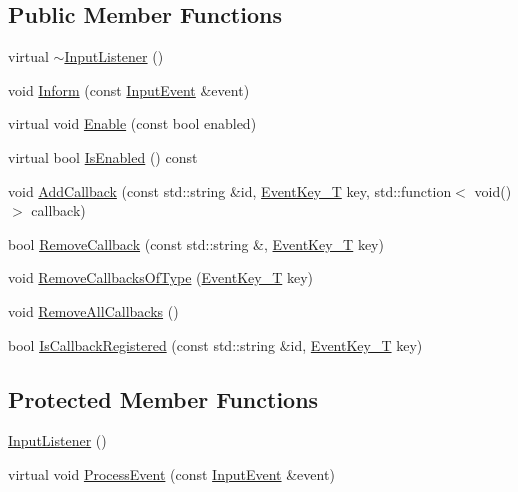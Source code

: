 \subsection*{Public Member Functions}
\begin{DoxyCompactItemize}
\item 
virtual \mbox{\hyperlink{classec_1_1_input_listener_afd65ca201e735f5758646d6653f42804}{$\sim$\+Input\+Listener}} ()
\item 
void \mbox{\hyperlink{classec_1_1_input_listener_afa340cac5b314410b157c1a63df32540}{Inform}} (const \mbox{\hyperlink{structec_1_1_input_event}{Input\+Event}} \&event)
\item 
virtual void \mbox{\hyperlink{classec_1_1_input_listener_abc475ae19a77d3b2f3cf622a23aad123}{Enable}} (const bool enabled)
\item 
virtual bool \mbox{\hyperlink{classec_1_1_input_listener_aab0a7d62f153cf1e10dfbfb58517e063}{Is\+Enabled}} () const
\item 
void \mbox{\hyperlink{classec_1_1_input_listener_abd10663298114e8790d695feab96b188}{Add\+Callback}} (const std\+::string \&id, \mbox{\hyperlink{namespaceec_a5de6bdb8c4b2ed6e590e721ec998f964}{Event\+Key\+\_\+T}} key, std\+::function$<$ void()$>$ callback)
\item 
bool \mbox{\hyperlink{classec_1_1_input_listener_a8903c97def61ce6b9b15f36b26998883}{Remove\+Callback}} (const std\+::string \&, \mbox{\hyperlink{namespaceec_a5de6bdb8c4b2ed6e590e721ec998f964}{Event\+Key\+\_\+T}} key)
\item 
void \mbox{\hyperlink{classec_1_1_input_listener_ae5cf00215ffda9b797e7d6954da2acef}{Remove\+Callbacks\+Of\+Type}} (\mbox{\hyperlink{namespaceec_a5de6bdb8c4b2ed6e590e721ec998f964}{Event\+Key\+\_\+T}} key)
\item 
void \mbox{\hyperlink{classec_1_1_input_listener_af7dd3e51508a10667973c36ef7ef48a8}{Remove\+All\+Callbacks}} ()
\item 
bool \mbox{\hyperlink{classec_1_1_input_listener_a82c8ee6b16d7b3a05d55aded95bcb658}{Is\+Callback\+Registered}} (const std\+::string \&id, \mbox{\hyperlink{namespaceec_a5de6bdb8c4b2ed6e590e721ec998f964}{Event\+Key\+\_\+T}} key)
\end{DoxyCompactItemize}
\subsection*{Protected Member Functions}
\begin{DoxyCompactItemize}
\item 
\mbox{\hyperlink{classec_1_1_input_listener_aa44d25c2b2d3ef5e72611831fd66e10c}{Input\+Listener}} ()
\item 
virtual void \mbox{\hyperlink{classec_1_1_input_listener_a25ef07efb72ac5c880cbca876ddfe66a}{Process\+Event}} (const \mbox{\hyperlink{structec_1_1_input_event}{Input\+Event}} \&event)
\end{DoxyCompactItemize}

